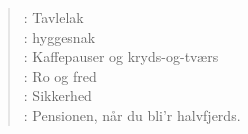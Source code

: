 \documentclass[a4paper,11pt]{article}
\begin{document}
\begin{sketch}
{\begin{verse}
: Tavlelak\\
: hyggesnak\\
: Kaffepauser og kryds-og-tværs\\
: Ro og fred\\
: Sikkerhed\\
: Pensionen, når du bli'r halvfjerds.\\
\end{verse}
}
\end{sketch}
\end{document}
